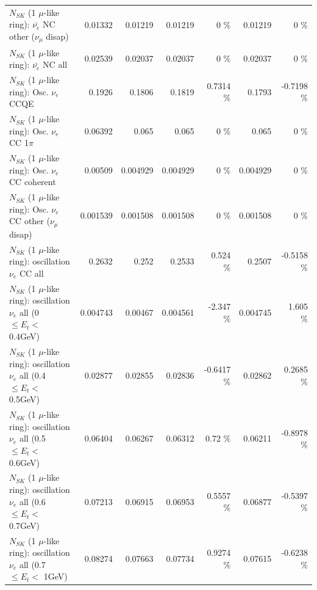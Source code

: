 \begin{table}
\begin{tabular}{| l | r | r | r  r | r  r |}
          $N_{SK}$ (1 $\mu$-like ring): $\bar{\nu_e}$ NC other ($\nu_\mu$ disap) &         0.01332 &         0.01219 &         0.01219 &        0 \%  &         0.01219 &        0 \%  \\ 
                            $N_{SK}$ (1 $\mu$-like ring): $\bar{\nu_{e}}$ NC all &         0.02539 &         0.02037 &         0.02037 &        0 \%  &         0.02037 &        0 \%  \\ 
\hline
\hline
\hline
                                 $N_{SK}$ (1 $\mu$-like ring): Osc. $\nu_e$ CCQE &          0.1926 &          0.1806 &          0.1819 &   0.7314 \%  &          0.1793 &  -0.7198 \%  \\ 
                            $N_{SK}$ (1 $\mu$-like ring): Osc. $\nu_e$ CC 1$\pi$ &         0.06392 &           0.065 &           0.065 &        0 \%  &           0.065 &        0 \%  \\ 
                          $N_{SK}$ (1 $\mu$-like ring): Osc. $\nu_e$ CC coherent &         0.00509 &        0.004929 &        0.004929 &        0 \%  &        0.004929 &        0 \%  \\ 
           $N_{SK}$ (1 $\mu$-like ring): Osc. $\nu_e$ CC other ($\nu_\mu$ disap) &        0.001539 &        0.001508 &        0.001508 &        0 \%  &        0.001508 &        0 \%  \\ 
                        $N_{SK}$ (1 $\mu$-like ring): oscillation $\nu_e$ CC all &          0.2632 &           0.252 &          0.2533 &    0.524 \%  &          0.2507 &  -0.5158 \%  \\ 
\hline
$N_{SK}$ (1 $\mu$-like ring): oscillation $\nu_{e}$ all (0 $\leq E_{t} <$ 0.4GeV) &        0.004743 &         0.00467 &        0.004561 &   -2.347 \%  &        0.004745 &    1.605 \%  \\ 
$N_{SK}$ (1 $\mu$-like ring): oscillation $\nu_{e}$ all (0.4 $\leq E_{t} <$ 0.5GeV) &         0.02877 &         0.02855 &         0.02836 &  -0.6417 \%  &         0.02862 &   0.2685 \%  \\ 
$N_{SK}$ (1 $\mu$-like ring): oscillation $\nu_{e}$ all (0.5 $\leq E_{t} <$ 0.6GeV) &         0.06404 &         0.06267 &         0.06312 &     0.72 \%  &         0.06211 &  -0.8978 \%  \\ 
$N_{SK}$ (1 $\mu$-like ring): oscillation $\nu_{e}$ all (0.6 $\leq E_{t} <$ 0.7GeV) &         0.07213 &         0.06915 &         0.06953 &   0.5557 \%  &         0.06877 &  -0.5397 \%  \\ 
$N_{SK}$ (1 $\mu$-like ring): oscillation $\nu_{e}$ all (0.7 $\leq E_{t} <$ 1GeV) &         0.08274 &         0.07663 &         0.07734 &   0.9274 \%  &         0.07615 &  -0.6238 \%  \\ 

\end{tabular}
\end{table}
